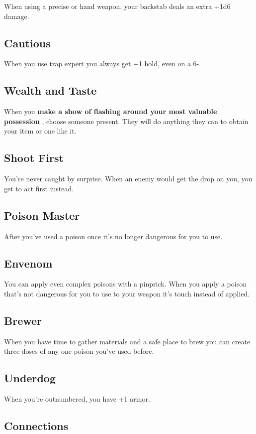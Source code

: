  When using a precise or hand weapon, your backstab deals an extra +1d6 damage.
\subsection{Cautious}


 When you use trap expert you always get +1 hold, even on a 6-.
\subsection{Wealth and Taste}


 When you \textbf{make a show of flashing around your most valuable possession}
, choose someone present. They will do anything they can to obtain your item or one like it.
\subsection{Shoot First}


 You're never caught by surprise. When an enemy would get the drop on you, you get to act first instead.
\subsection{Poison Master}


 After you've used a poison once it's no longer dangerous for you to use.
\subsection{Envenom}


 You can apply even complex poisons with a pinprick. When you apply a poison that's not dangerous for you to use to your weapon it's touch instead of applied.
\subsection{Brewer}


 When you have time to gather materials and a safe place to brew you can create three doses of any one poison you've used before.
\subsection{Underdog}


 When you're outnumbered, you have +1 armor.
\subsection{Connections}


